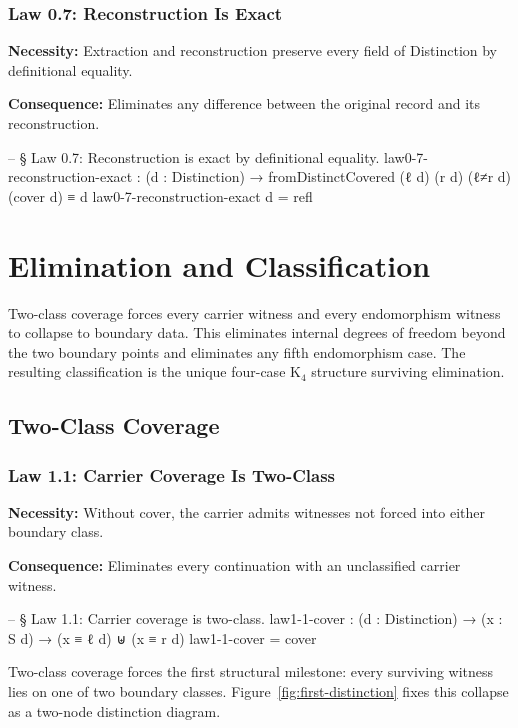 \documentclass[11pt,a4paper]{book}
\def\texttt#1{#1}%
\begin{document}
\subsection{Law 0.7: Reconstruction Is Exact}

\textbf{Necessity:} Extraction and reconstruction preserve every field of \texttt{Distinction} by definitional equality.

\textbf{Consequence:} Eliminates any difference between the original record and its reconstruction.

\begin{code}
-- § Law 0.7: Reconstruction is exact by definitional equality.
law0-7-reconstruction-exact :
  (d : Distinction) →
  fromDistinctCovered (ℓ d) (r d) (ℓ≠r d) (cover d) ≡ d
law0-7-reconstruction-exact d = refl
\end{code}

\chapter{Elimination and Classification}

Two-class coverage forces every carrier witness and every endomorphism witness to collapse to boundary data.
This eliminates internal degrees of freedom beyond the two boundary points and eliminates any fifth endomorphism case.
The resulting classification is the unique four-case K$_4$ structure surviving elimination.

\section{Two-Class Coverage}

\subsection{Law 1.1: Carrier Coverage Is Two-Class}

\textbf{Necessity:} Without \texttt{cover}, the carrier admits witnesses not forced into either boundary class.

\textbf{Consequence:} Eliminates every continuation with an unclassified carrier witness.

\begin{code}
-- § Law 1.1: Carrier coverage is two-class.
law1-1-cover : (d : Distinction) → (x : S d) → (x ≡ ℓ d) ⊎ (x ≡ r d)
law1-1-cover = cover
\end{code}

Two-class coverage forces the first structural milestone: every surviving witness lies on one of two boundary classes. Figure~\ref{fig:first-distinction} fixes this collapse as a two-node distinction diagram.
\end{document}
